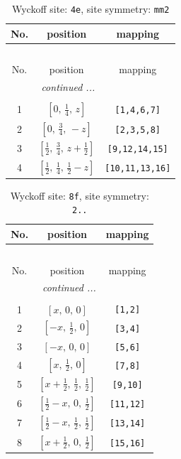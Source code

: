 \documentclass[fleqn,8pt]{jsarticle}
\begin{document}
\renewcommand{\arraystretch}{1.2}
\begin{longtable}{ccc}
\caption{Wyckoff site: {\tt 4e}, site symmetry: {\tt mm2}}
 \\
 \hline \hline
No. & position & mapping \\ \hline \endfirsthead

\multicolumn{2}{l}{\tablename\ \thetable{}} \\
 \hline \hline
No. & position & mapping \\ \hline \endhead

 \hline \hline
\multicolumn{2}{r}{\footnotesize\it continued ...} \\ \endfoot

 \hline \hline
\multicolumn{2}{r}{} \\ \endlastfoot

1 & $\left[ 0,\, \frac{1}{4},\, z \right]$ & {\tt [1,4,6,7]} \\ \hline
2 & $\left[ 0,\, \frac{3}{4},\, - z \right]$ & {\tt [2,3,5,8]} \\ \hline
3 & $\left[ \frac{1}{2},\, \frac{3}{4},\, z + \frac{1}{2} \right]$ & {\tt [9,12,14,15]} \\ \hline
4 & $\left[ \frac{1}{2},\, \frac{1}{4},\, \frac{1}{2} - z \right]$ & {\tt [10,11,13,16]} \\
\end{longtable}
\renewcommand{\arraystretch}{1.2}
\begin{longtable}{ccc}
\caption{Wyckoff site: {\tt 8f}, site symmetry: {\tt 2..}}
 \\
 \hline \hline
No. & position & mapping \\ \hline \endfirsthead

\multicolumn{2}{l}{\tablename\ \thetable{}} \\
 \hline \hline
No. & position & mapping \\ \hline \endhead

 \hline \hline
\multicolumn{2}{r}{\footnotesize\it continued ...} \\ \endfoot

 \hline \hline
\multicolumn{2}{r}{} \\ \endlastfoot

1 & $\left[ x,\, 0,\, 0 \right]$ & {\tt [1,2]} \\ \hline
2 & $\left[ - x,\, \frac{1}{2},\, 0 \right]$ & {\tt [3,4]} \\ \hline
3 & $\left[ - x,\, 0,\, 0 \right]$ & {\tt [5,6]} \\ \hline
4 & $\left[ x,\, \frac{1}{2},\, 0 \right]$ & {\tt [7,8]} \\ \hline
5 & $\left[ x + \frac{1}{2},\, \frac{1}{2},\, \frac{1}{2} \right]$ & {\tt [9,10]} \\ \hline
6 & $\left[ \frac{1}{2} - x,\, 0,\, \frac{1}{2} \right]$ & {\tt [11,12]} \\ \hline
7 & $\left[ \frac{1}{2} - x,\, \frac{1}{2},\, \frac{1}{2} \right]$ & {\tt [13,14]} \\ \hline
8 & $\left[ x + \frac{1}{2},\, 0,\, \frac{1}{2} \right]$ & {\tt [15,16]} \\
\end{longtable}
\end{document}
